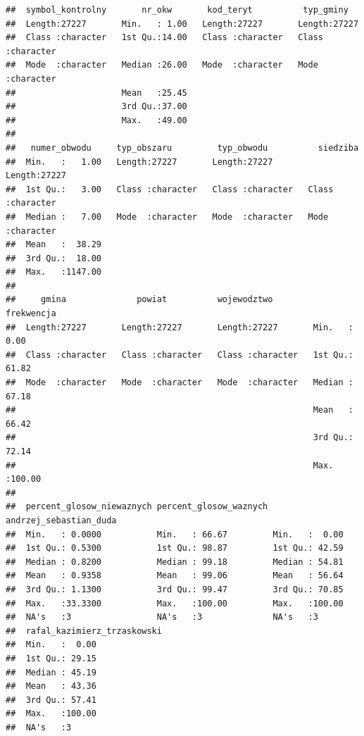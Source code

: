 \documentclass[
]{book}
\begin{document}
\begin{verbatim}
##  symbol_kontrolny       nr_okw       kod_teryt          typ_gminy        
##  Length:27227       Min.   : 1.00   Length:27227       Length:27227      
##  Class :character   1st Qu.:14.00   Class :character   Class :character  
##  Mode  :character   Median :26.00   Mode  :character   Mode  :character  
##                     Mean   :25.45                                        
##                     3rd Qu.:37.00                                        
##                     Max.   :49.00                                        
##                                                                          
##   numer_obwodu     typ_obszaru         typ_obwodu          siedziba        
##  Min.   :   1.00   Length:27227       Length:27227       Length:27227      
##  1st Qu.:   3.00   Class :character   Class :character   Class :character  
##  Median :   7.00   Mode  :character   Mode  :character   Mode  :character  
##  Mean   :  38.29                                                           
##  3rd Qu.:  18.00                                                           
##  Max.   :1147.00                                                           
##                                                                            
##     gmina              powiat          wojewodztwo          frekwencja    
##  Length:27227       Length:27227       Length:27227       Min.   :  0.00  
##  Class :character   Class :character   Class :character   1st Qu.: 61.82  
##  Mode  :character   Mode  :character   Mode  :character   Median : 67.18  
##                                                           Mean   : 66.42  
##                                                           3rd Qu.: 72.14  
##                                                           Max.   :100.00  
##                                                                           
##  percent_glosow_niewaznych percent_glosow_waznych andrzej_sebastian_duda
##  Min.   : 0.0000           Min.   : 66.67         Min.   :  0.00        
##  1st Qu.: 0.5300           1st Qu.: 98.87         1st Qu.: 42.59        
##  Median : 0.8200           Median : 99.18         Median : 54.81        
##  Mean   : 0.9358           Mean   : 99.06         Mean   : 56.64        
##  3rd Qu.: 1.1300           3rd Qu.: 99.47         3rd Qu.: 70.85        
##  Max.   :33.3300           Max.   :100.00         Max.   :100.00        
##  NA's   :3                 NA's   :3              NA's   :3             
##  rafal_kazimierz_trzaskowski
##  Min.   :  0.00             
##  1st Qu.: 29.15             
##  Median : 45.19             
##  Mean   : 43.36             
##  3rd Qu.: 57.41             
##  Max.   :100.00             
##  NA's   :3
\end{verbatim}
\end{document}
